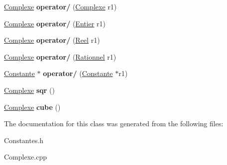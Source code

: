 \begin{DoxyCompactItemize}
\item 
\hypertarget{class_calcul_1_1_complexe_ad43d455f0c78e8c8286718a53770716d}{\hyperlink{class_calcul_1_1_complexe}{Complexe} {\bfseries operator/} (\hyperlink{class_calcul_1_1_complexe}{Complexe} r1)}\label{class_calcul_1_1_complexe_ad43d455f0c78e8c8286718a53770716d}

\item 
\hypertarget{class_calcul_1_1_complexe_a30bb25d0dc2d4682b41d1fa75e1e9b9d}{\hyperlink{class_calcul_1_1_complexe}{Complexe} {\bfseries operator/} (\hyperlink{class_calcul_1_1_entier}{Entier} r1)}\label{class_calcul_1_1_complexe_a30bb25d0dc2d4682b41d1fa75e1e9b9d}

\item 
\hypertarget{class_calcul_1_1_complexe_aeda42f5c908477ce344afdef2b979f5b}{\hyperlink{class_calcul_1_1_complexe}{Complexe} {\bfseries operator/} (\hyperlink{class_calcul_1_1_reel}{Reel} r1)}\label{class_calcul_1_1_complexe_aeda42f5c908477ce344afdef2b979f5b}

\item 
\hypertarget{class_calcul_1_1_complexe_a783b5949f0ed1f6a5a9b4db367ec2d72}{\hyperlink{class_calcul_1_1_complexe}{Complexe} {\bfseries operator/} (\hyperlink{class_calcul_1_1_rationnel}{Rationnel} r1)}\label{class_calcul_1_1_complexe_a783b5949f0ed1f6a5a9b4db367ec2d72}

\item 
\hypertarget{class_calcul_1_1_complexe_a9cba41b08b70e3b1f322617cf8568dd4}{\hyperlink{class_calcul_1_1_constante}{Constante} $\ast$ {\bfseries operator/} (\hyperlink{class_calcul_1_1_constante}{Constante} $\ast$r1)}\label{class_calcul_1_1_complexe_a9cba41b08b70e3b1f322617cf8568dd4}

\item 
\hypertarget{class_calcul_1_1_complexe_a0ecafe9cdd55cc5f04ea3c8316764139}{\hyperlink{class_calcul_1_1_complexe}{Complexe} {\bfseries sqr} ()}\label{class_calcul_1_1_complexe_a0ecafe9cdd55cc5f04ea3c8316764139}

\item 
\hypertarget{class_calcul_1_1_complexe_a08d3991ff3a10788c131fdf67ac4524f}{\hyperlink{class_calcul_1_1_complexe}{Complexe} {\bfseries cube} ()}\label{class_calcul_1_1_complexe_a08d3991ff3a10788c131fdf67ac4524f}

\end{DoxyCompactItemize}


The documentation for this class was generated from the following files\-:\begin{DoxyCompactItemize}
\item 
Constantes.\-h\item 
Complexe.\-cpp\end{DoxyCompactItemize}
